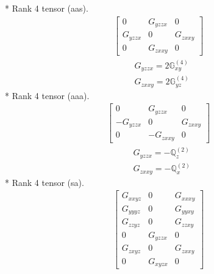\documentclass[fleqn,8pt,landscape]{jsarticle}
\begin{document}
* Rank 4 tensor (aas).
\begin{align*}
\begin{bmatrix} 0 & G_{yzzx} & 0 \\ G_{yzzx} & 0 & G_{zxxy} \\ 0 & G_{zxxy} & 0 \end{bmatrix}
\end{align*}
\begin{align*}
& G_{yzzx} = 2 \mathbb{G}_{xy}^{(4)} \\
& G_{zxxy} = 2 \mathbb{G}_{yz}^{(4)}
\end{align*}
* Rank 4 tensor (aaa).
\begin{align*}
\begin{bmatrix} 0 & G_{yzzx} & 0 \\ - G_{yzzx} & 0 & G_{zxxy} \\ 0 & - G_{zxxy} & 0 \end{bmatrix}
\end{align*}
\begin{align*}
& G_{yzzx} = - \mathbb{Q}_{z}^{(2)} \\
& G_{zxxy} = - \mathbb{Q}_{x}^{(2)}
\end{align*}
* Rank 4 tensor (sa).
\begin{align*}
\begin{bmatrix} G_{xxyz} & 0 & G_{xxxy} \\ G_{yyyz} & 0 & G_{yyxy} \\ G_{zzyz} & 0 & G_{zzxy} \\ 0 & G_{yzzx} & 0 \\ G_{zxyz} & 0 & G_{zxxy} \\ 0 & G_{xyzx} & 0 \end{bmatrix}
\end{align*}
\end{document}
